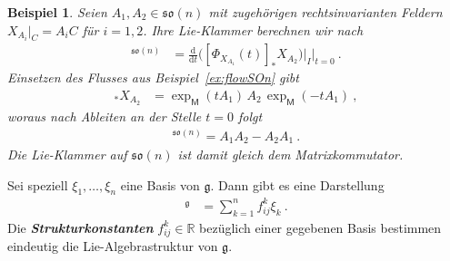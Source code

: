 \documentclass[10pt,a4paper]{article}
\theoremstyle{mytheorem}
\theoremstyle{mydefinition}
\newtheorem{example}[theorem]{Beispiel}
\newcommand{\mydef}[1]{\textbf{\textit{#1}}}
\newcommand{\dt}{\mathrm{d}}
\newcommand{\fso}{\mathfrak{so}}
\begin{document}
\begin{example}
Seien $A_1, A_2\in\fso(n)$ mit zugehörigen rechtsinvarianten Feldern $X_{A_i}|_C=A_iC$ für $i=1,2$.
Ihre Lie-Klammer berechnen wir nach
\begin{align*}
	[A_1, A_2]^{\fso(n)}
	&= \frac{\dt}{\dt t}
		\big(
			[\Phi_{X_{A_1}}(t)]_* X_{A_2}
		\big)
		\big|_{I}
	\Big|_{t=0}
	\ .
\end{align*}
Einsetzen des Flusses aus Beispiel~\ref{ex:flowSOn} gibt
\begin{align*}
	[\Phi_{X_{A_1}}(t)]_* X_{A_2}
	&= \exp_\mathsf{M}(tA_1)\,A_2\,\exp_\mathsf{M}(-tA_1)
	\ ,
\end{align*}
woraus nach Ableiten an der Stelle $t=0$ folgt
\begin{align*}
	[A_1, A_2]^{\fso(n)} = A_1A_2-A_2A_1
	\ .
\end{align*}
Die Lie-Klammer auf $\fso(n)$ ist damit gleich dem Matrixkommutator.
\end{example}

Sei speziell $\xi_1,\ldots,\xi_n$ eine Basis von $\mathfrak{g}$.
Dann gibt es eine Darstellung
\begin{align*}
	[\xi_i,\xi_j]^\mathfrak{g}
	&= \sum_{k=1}^n f^k_{ij} \xi_k
	\ .
\end{align*}
Die \mydef{Strukturkonstanten} $f^k_{ij}\in\mathbb{R}$ bezüglich einer gegebenen Basis bestimmen eindeutig die Lie-Algebrastruktur von $\mathfrak{g}$.
\end{document}

